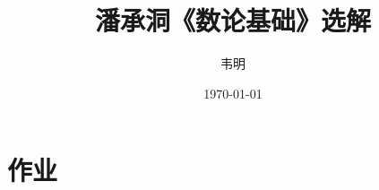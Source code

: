 \documentclass[12pt,lang=cn,thmcnt=subsection,pad]{elegantbook}
\title{潘承洞《数论基础》选解}
\author{韦明}
\date{\today}
\numberwithin{equation}{section}
\begin{document}
\maketitle
\frontmatter
%

\tableofcontents

\mainmatter
\chapter{作业}
%





\end{document}
